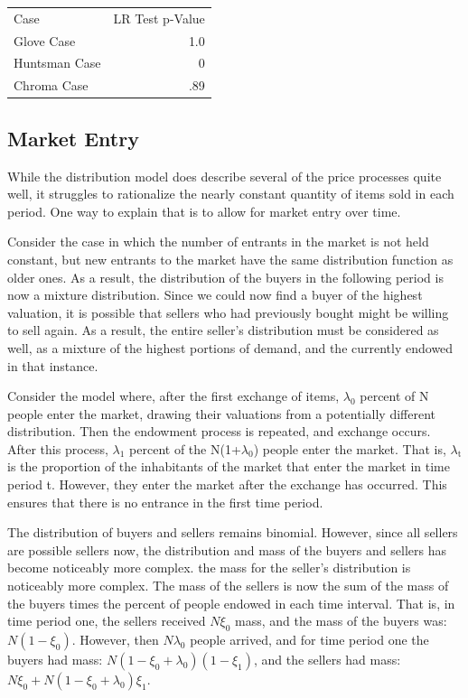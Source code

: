 \documentclass[12pt, letterpaper]{paper}
\begin{document}
\begin{center}
\begin{tabular}{lr}
Case & LR Test p-Value\\
Glove Case & 1.0\\
Huntsman Case & 0\\
Chroma Case & .89\\
\end{tabular}
\end{center}


\subsection{Market Entry}
\label{sec-2-5}

While the distribution model does describe several of the price
processes quite well, it struggles to rationalize the nearly constant
quantity of items sold in each period. One way to explain that is to
allow for market entry over time.

Consider the case in which the number of entrants in the market is not
held constant, but new entrants to the market have the same
distribution function as older ones. As a result, the distribution of
the buyers in the following period is now a mixture
distribution. Since we could now find a buyer of the highest
valuation, it is possible that sellers who had previously bought might
be willing to sell again. As a result, the entire seller's
distribution must be considered as well, as a mixture of the highest
portions of demand, and the currently endowed in that instance. 

Consider the model where, after the first exchange of items, $\lambda$$_{\text{0}}$
percent of N people enter the market, drawing their valuations from a
potentially different distribution. Then the endowment process is
repeated, and exchange occurs. After this process, $\lambda$$_{\text{1}}$ percent of the
N(1+$\lambda$$_{\text{0}}$) people enter the market. That is, $\lambda$$_{\text{t}}$ is the proportion of the
inhabitants of the market that enter the market in time period
t. However, they enter the market after the exchange has
occurred. This ensures that there is no entrance in the first time
period.

The distribution of buyers and sellers remains binomial. However,
since all sellers are possible sellers now, the distribution and mass
of the buyers and sellers has become noticeably more complex. the mass for the seller's
distribution is noticeably more complex. The mass of the sellers is
now the sum of the mass of the buyers times the percent of people
endowed in each time interval. That is, in time period one, the
sellers received $N \xi_0$ mass, and the mass of the buyers was:
$N(1-\xi_0)$. However, then $N\lambda_0$ people arrived, and for time period one
the buyers had mass: $N( 1 -\xi_0 + \lambda_0)(1-\xi_1)$, and the sellers had mass:
$N \xi_0 + N(1-\xi_0 + \lambda_0)\xi_1$. 
\end{document}
